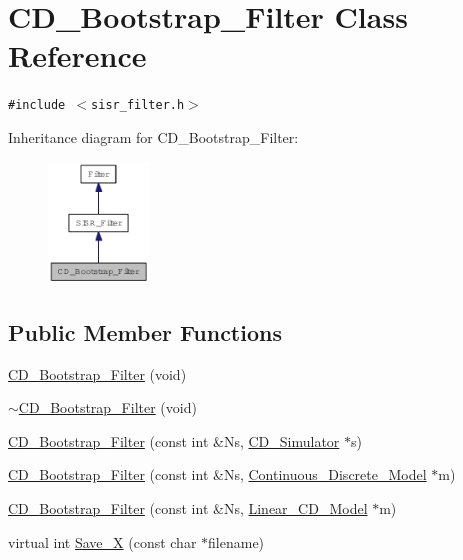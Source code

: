 \hypertarget{class_c_d___bootstrap___filter}{
\section{CD\_\-Bootstrap\_\-Filter Class Reference}
\label{class_c_d___bootstrap___filter}
}
{\tt \#include $<$sisr\_\-filter.h$>$}

Inheritance diagram for CD\_\-Bootstrap\_\-Filter:\nopagebreak
\begin{figure}[H]
\begin{center}
\leavevmode
\includegraphics[width=76pt]{class_c_d___bootstrap___filter__inherit__graph}
\end{center}
\end{figure}
\subsection*{Public Member Functions}
\begin{CompactItemize}
\item 
\hyperlink{class_c_d___bootstrap___filter_5a6857c370a2573d8e3bcb4eab10eef2}{CD\_\-Bootstrap\_\-Filter} (void)
\item 
\hyperlink{class_c_d___bootstrap___filter_13d757890e69283429b4a17893b639bc}{$\sim$CD\_\-Bootstrap\_\-Filter} (void)
\item 
\hyperlink{class_c_d___bootstrap___filter_b57c5fe3037188132aadb91d883da2dd}{CD\_\-Bootstrap\_\-Filter} (const int \&Ns, \hyperlink{class_c_d___simulator}{CD\_\-Simulator} $\ast$s)
\item 
\hyperlink{class_c_d___bootstrap___filter_bff15b578b01eb0b7cb4d71f044123a2}{CD\_\-Bootstrap\_\-Filter} (const int \&Ns, \hyperlink{class_continuous___discrete___model}{Continuous\_\-Discrete\_\-Model} $\ast$m)
\item 
\hyperlink{class_c_d___bootstrap___filter_2b404414afe25a0a62abf45d22e34a8c}{CD\_\-Bootstrap\_\-Filter} (const int \&Ns, \hyperlink{class_linear___c_d___model}{Linear\_\-CD\_\-Model} $\ast$m)
\item 
virtual int \hyperlink{class_c_d___bootstrap___filter_eb203b8cdeb51133a232dce5763ed153}{Save\_\-X} (const char $\ast$filename)
\end{CompactItemize}
